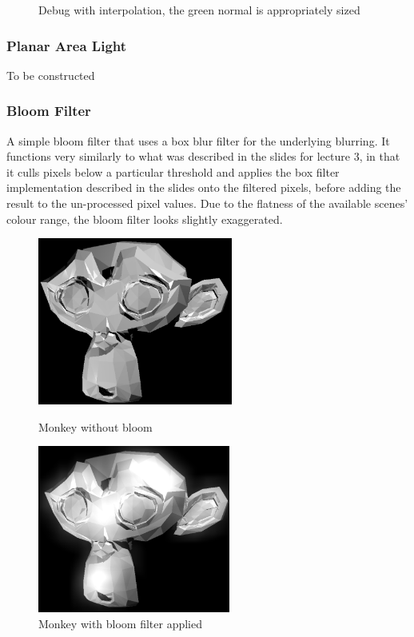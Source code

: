 \documentclass{article}
\begin{document}
\begin{figure}[!htb]
        \caption*{Debug with interpolation, the green normal is appropriately sized}
      \endminipage
    \end{figure}

    \subsubsection{Planar Area Light}
    To be constructed

    \subsubsection{Bloom Filter}
    A simple bloom filter that uses a box blur filter for the underlying blurring. It functions very similarly 
    to what was described in the slides for lecture 3, in that it culls pixels below a particular threshold 
    and applies the box filter implementation described in the slides onto the filtered pixels, before adding 
    the result to the un-processed pixel values. Due to the flatness of the available scenes' colour range,
    the bloom filter looks slightly exaggerated.

    \begin{figure}[!htb]
          \includegraphics[width=\linewidth, height=5.5cm]{images/monkey_no_bloom}
          \caption*{Monkey without bloom}
        \endminipage\hfill
          \includegraphics[width=\linewidth, height=5.5cm]{images/monkey_bloom}
          \caption*{Monkey with bloom filter applied}
        \endminipage
    \end{figure}
    
\end{document}
